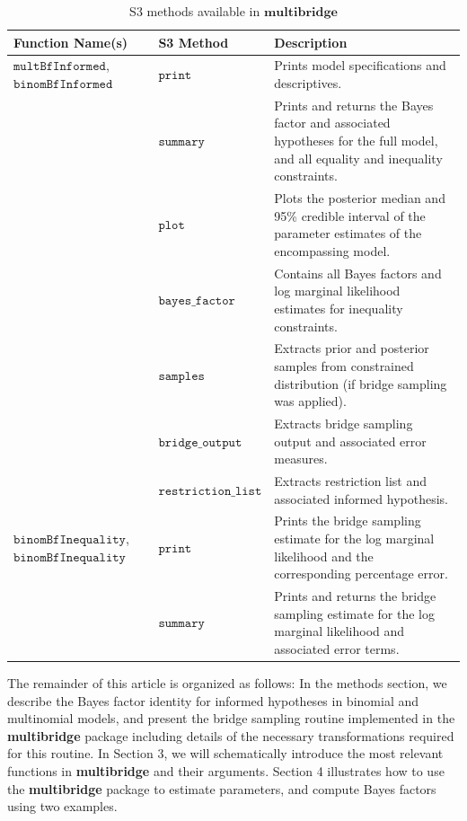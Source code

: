 \documentclass[
  english,
  man,floatsintext]{apa6}
\begin{document}
\begin{table}
\caption {S3 methods available in $\textbf{multibridge}$}
\label{table:s3_methods}
\begin{center}
\begin{tabular}{p{4cm}p{3.5cm}p{9cm}}
        \toprule
Function Name(s) & S3 Method & Description \\\midrule
$\texttt{multBfInformed}$, $\texttt{binomBfInformed}$ & $\texttt{print}$ & Prints model specifications and descriptives. \\
 & $\texttt{summary}$ &  Prints and returns the Bayes factor and associated hypotheses for the full model, and all equality and inequality constraints.\\
  & $\texttt{plot}$ &  Plots the posterior median and 95\% credible interval of the parameter estimates of the encompassing model.\\
 & $\texttt{bayes\_factor}$ & Contains all Bayes factors and log marginal likelihood estimates for inequality constraints.\\
 & $\texttt{samples}$ & Extracts prior and posterior samples from constrained distribution (if bridge sampling was applied). \\
& $\texttt{bridge\_output}$    &  Extracts bridge sampling output and associated error measures.\\
& $\texttt{restriction\_list}$ & Extracts restriction list and associated informed hypothesis. \\
$\texttt{binomBfInequality}$, $\texttt{binomBfInequality}$  & $\texttt{print}$ & Prints the bridge sampling estimate for the log marginal likelihood and the corresponding percentage error. \\
& $\texttt{summary}$ & Prints and returns the bridge sampling estimate for the log marginal likelihood and associated error terms.\\
\bottomrule
\end{tabular}
\end{center}
\end{table}

The remainder of this article is organized as follows: In the methods section, we describe the Bayes factor identity for informed hypotheses in binomial and multinomial models, and present the bridge sampling routine implemented in the \textbf{multibridge} package including details of the necessary transformations required for this routine. In Section 3, we will schematically introduce the most relevant functions in \textbf{multibridge} and their arguments. Section 4 illustrates how to use the \textbf{multibridge} package to estimate parameters, and compute Bayes factors using two examples.
\end{document}
